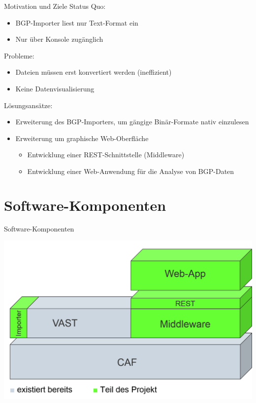 \documentclass[9pt]{beamer}
\begin{document}
\begin{frame}{Motivation und Ziele}{}
   Status Quo:
	\begin{itemize}
		\item BGP-Importer liest nur Text-Format ein
		\item Nur über Konsole zugänglich
		\end{itemize}
		\vspace{0,2cm}		
	Probleme:
		\begin{itemize}
		\item Dateien müssen erst konvertiert werden (ineffizient)
		\item Keine Datenvisualisierung
		\end{itemize}
		\vspace{0,2cm}
	Lösungsansätze:
		\begin{itemize}
			\item Erweiterung des BGP-Importers, um gängige Binär-Formate nativ 
			         einzulesen
			\item Erweiterung um graphische Web-Oberfläche
			\vspace{0,1cm}
		\begin{itemize}
			\item Entwicklung einer REST-Schnittstelle (Middleware)
			\item Entwicklung einer Web-Anwendung für die Analyse von BGP-Daten
		\end{itemize}
		\end{itemize}
\end{frame}

\section{Software-Komponenten}

\begin{frame}{Software-Komponenten}{}
	\begin{center}
		\includegraphics[width=1.0\textwidth]{res/software-komponenten.png}
	\end{center}
\end{frame}
\end{document}
